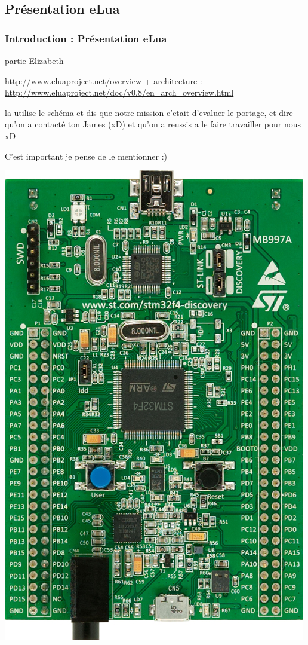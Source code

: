 \documentclass{beamer}
\begin{document}
\subsection{Présentation eLua}
\begin{frame}
\frametitle{Introduction : Présentation eLua}
partie Elizabeth

\url{http://www.eluaproject.net/overview} + 
architecture : \url{http://www.eluaproject.net/doc/v0.8/en_arch_overview.html}


la utilise le schéma et dis que notre mission c'etait d'evaluer le portage, et dire 
qu'on a contacté ton James (xD) et qu'on a reussis a le faire travailler pour nous xD

C'est important je pense de le mentionner :)
\begin{center}
 \includegraphics[scale=0.1]{../images/stm32f4_discovery.jpg}
\end{center}
\end{frame}
\end{document}
